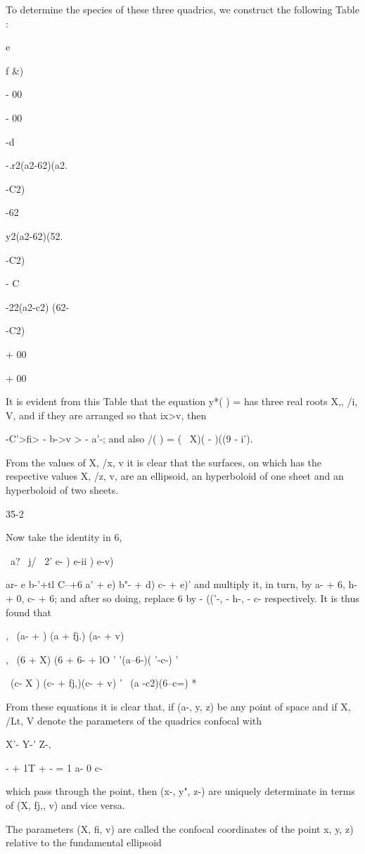 {{To determine the species of these three quadrics, we construct the
following Table :

e

f \&)

- 00

- 00

-d

-.r2(a2-62)(a2.

-C2)

-62

y2(a2-62)(52.

-C2)

- C

-22(a2-c2) (62-

-C2)

+ 00

+ 00

It is evident from this Table that the equation y*( ) = has three real
roots X,, /i, V, and if they are arranged so that ix>v, then

 -C'>fi> - b->v > - a'-; and also /( ) = ( \ X)( - )((9 - i').

From the values of X, /x, v it is clear that the surfaces, on which
has the respective values X, /z, v, are an ellipsoid, an hyperboloid
of one sheet and an hyperboloid of two sheets.

35-2

%
%

Now take the identity in 6,

\ a? \ j/ \ 2' e- ) e-ii ) e-v)

ar- e b-'+tl C--+6 a' + e) b"- + d) c- + e)' and multiply it, in turn,
by a- + 6, h- + 0, c- + 6; and after so doing, replace 6 by - (('-, -
h-, - c- respectively. It is thus found that

, \ (a- + ) (a + fj.) (a- + v)

, \ (6 + X) (6 + 6- + lO ' '(a--6-)( '-c-) '

  \ (c- X ) (c- + fj,)(c- + v) '~ (a -c2)(6--c=) *

From these equations it is clear that, if (a-, y, z) be any point of
space and if X, /Lt, V denote the parameters of the quadrics confocal
with

X'- Y-' Z-,

- + 1T + - = 1 a- 0 c-

which pass through the point, then (x-, y", z-) are uniquely
determinate in terms of (X, fj,, v) and vice versa.

The parameters (X, fi, v) are called the confocal coordinates of the
point x, y, z) relative to the fundamental ellipsoid

}}
